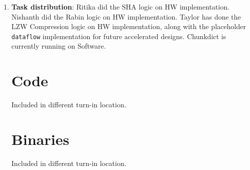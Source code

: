 \documentclass{article}
\begin{document}
\begin{enumerate}
\item%
\textbf{Task distribution}: 
Ritika did the SHA logic on HW implementation. 
Nishanth did the Rabin logic on HW implementation.
Taylor has done the LZW Compression logic on HW implementation, along with the placeholder \texttt{dataflow} implementation for future accelerated designs.
Chunkdict is currently running on Software. 
\newline

\section{Code}

Included in different turn-in location.

\section{Binaries}

Included in different turn-in location.


\begin{appendices}
%
%
%


\end{appendices}




\end{enumerate}
\end{document}
